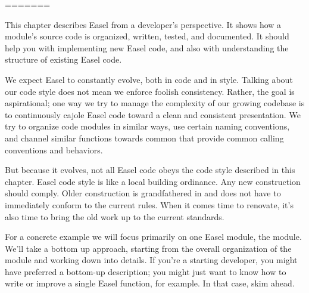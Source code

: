=======

This chapter describes Easel from a developer's perspective. It shows
how a module's source code is organized, written, tested, and
documented. It should help you with implementing new Easel code, and
also with understanding the structure of existing Easel code.

We expect Easel to constantly evolve, both in code and in style.
Talking about our code style does not mean we enforce foolish
consistency. Rather, the goal is aspirational; one way we try to
manage the complexity of our growing codebase is to continuously
cajole Easel code toward a clean and consistent presentation. We try
to organize code modules in similar ways, use certain naming
conventions, and channel similar functions towards common
 that provide common calling conventions and
behaviors.

But because it evolves, not all Easel code obeys the code style
described in this chapter. Easel code style is like a local building
ordinance. Any new construction should comply. Older construction is
grandfathered in and does not have to immediately conform to the
current rules. When it comes time to renovate, it's also time to bring
the old work up to the current standards.

For a concrete example we will focus primarily on one Easel module,
the  module. We'll take a bottom up approach, starting
from the overall organization of the module and working down into
details. If you're a starting developer, you might have preferred a
bottom-up description; you might just want to know how to write or
improve a single Easel function, for example. In that case, skim
ahead.

